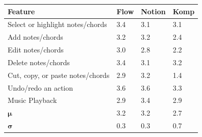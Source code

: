 		\begin{table}[H]
		  \centering
		   \label{tab:compare-i4}
		  \begin{tabular}{|p{6cm}|R{1.5cm}|R{1.5cm}|R{1.5cm}|}
		  	\hline 
		  	\textbf{Feature} & \textbf{Flow} & \textbf{Notion} & \textbf{Komp} \\ \hline

			Select or highlight notes/chords 		& 3.4 & 3.1 & 3.1 \\ \hline
			Add notes/chords 							& 3.2 & 3.2 & 2.4 \\ \hline
			Edit notes/chords 							& 3.0 & 2.8 & 2.2 \\ \hline
			Delete notes/chords 						& 3.4 & 3.1 & 3.2 \\ \hline
			Cut, copy, or paste notes/chords 	& 2.9 & 3.2 & 1.4 \\ \hline
			Undo/redo an action 						& 3.6 & 3.6 & 3.3 \\ \hline
			Music Playback 								& 2.9 & 3.4 & 2.9 \\ \hline

			\begin{math}\bm{\mu}\end{math} 		& 3.2 & 3.2 & 2.7 \\ \hline
			\begin{math}\bm{\sigma}\end{math} 	& 0.3 & 0.3 & 0.7 \\ \hline
		  \end{tabular}
		\end{table}



